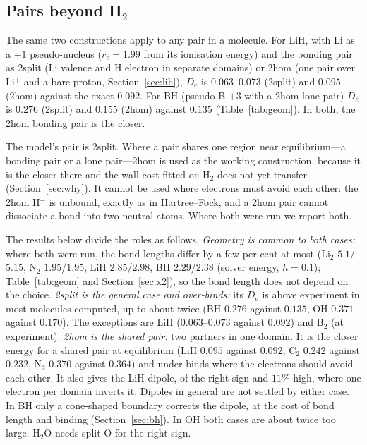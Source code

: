\documentclass[11pt]{article}
\begin{document}
\subsection{Pairs beyond H$_2$}
\label{sec:bracket}

The same two constructions apply to any pair in a molecule. For LiH, with Li as a $+1$
pseudo-nucleus ($r_c = 1.99$ from its ionisation energy) and the bonding pair as 2split (Li valence
and H electron in separate domains) or 2hom (one pair over Li$^+$ and a bare proton,
Section~\ref{sec:lih}), $D_e$ is $0.063$--$0.073$ (2split) and $0.095$ (2hom) against the exact
$0.092$. For BH (pseudo-B $+3$ with a 2hom lone pair) $D_e$ is $0.276$ (2split) and $0.155$
(2hom) against $0.135$ (Table~\ref{tab:geom}). In both, the 2hom bonding pair is the closer.

The model's pair is 2split. Where a pair shares one region near equilibrium---a bonding pair or a lone
pair---2hom is used as the working construction, because it is the closer there and the wall cost fitted
on H$_2$ does not yet transfer (Section~\ref{sec:why}). It cannot be used where electrons must avoid each
other: the 2hom H$^-$ is unbound, exactly as in Hartree--Fock, and a 2hom pair cannot dissociate a bond into
two neutral atoms. Where both were run we report both.

The results below divide the roles as follows. \emph{Geometry is common to both cases:} where both
were run, the bond lengths differ by a few per cent at most (Li$_2$ $5.1$/$5.15$, N$_2$
$1.95$/$1.95$, LiH $2.85$/$2.98$, BH $2.29$/$2.38$ (solver energy, $h = 0.1$); Table~\ref{tab:geom} and
Section~\ref{sec:x2}), so the bond length does not depend on the choice. \emph{2split is the general
case and over-binds:} its $D_e$ is above experiment in most molecules computed, up to about
twice (BH $0.276$ against $0.135$, OH $0.371$ against $0.170$). The exceptions are LiH
($0.063$--$0.073$ against $0.092$) and B$_2$ (at experiment). \emph{2hom is the shared pair:} two
partners in one domain. It is the closer energy for a shared pair at equilibrium (LiH $0.095$ against
$0.092$, C$_2$ $0.242$ against $0.232$, N$_2$ $0.370$ against $0.364$) and under-binds where the
electrons should avoid each other. It also gives the LiH dipole, of the right sign and $11\%$ high,
where one electron per domain inverts it. Dipoles in general are not settled by either case. In
BH only a cone-shaped boundary corrects the dipole, at the cost of bond length and binding
(Section~\ref{sec:bh}). In OH both cases are about twice too large. H$_2$O needs split O for the
right sign.
\end{document}
